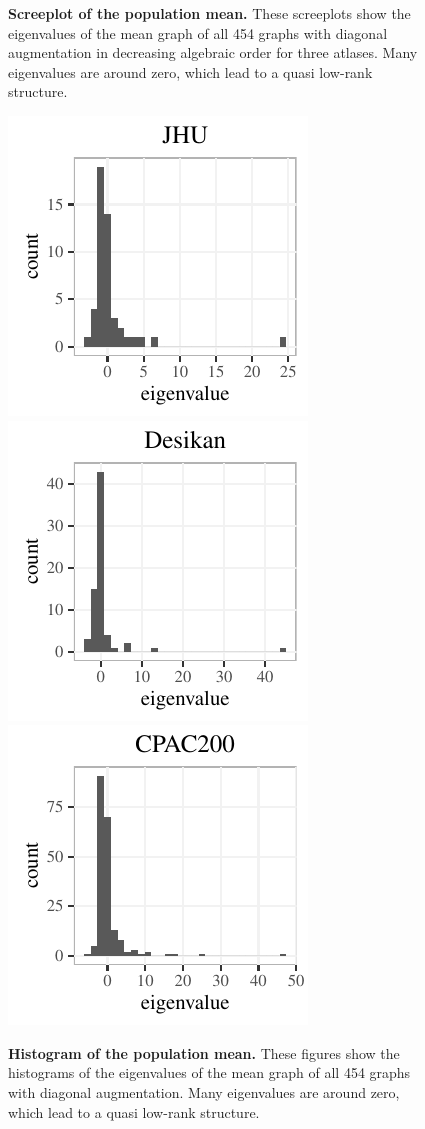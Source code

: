 \documentclass[simplex.tex]{subfiles}
\begin{document}
\begin{figure}[!htbp]
\caption{{\bf Screeplot of the population mean.}
These screeplots show the eigenvalues of the mean graph of all 454 graphs with diagonal augmentation in decreasing algebraic order for three atlases. Many eigenvalues are around zero, which lead to a quasi low-rank structure.
}
\label{fig:screeplot}
\end{figure}

\begin{figure}[!htbp]
\centering
\includegraphics[height=.2\textheight]{../../figs/hist_JHU.pdf} 
\includegraphics[height=.2\textheight]{../../figs/hist_desikan.pdf} 
\includegraphics[height=.2\textheight]{../../figs/hist_CPAC200.pdf}
\caption{{\bf Histogram of the population mean.}
These figures show the histograms of the eigenvalues of the mean graph of all 454 graphs with diagonal augmentation. Many eigenvalues are around zero, which lead to a quasi low-rank structure.
}
\label{fig:histogram}
\end{figure}
\end{document}
